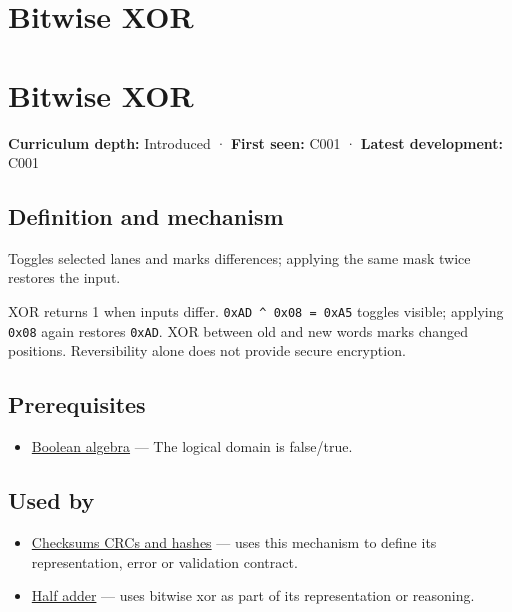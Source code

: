 \hypertarget{appendix-d49161831368}{}
\section*{Bitwise XOR}
\section{Bitwise XOR}\label{appendix-d49161831368-bitwise-xor}

\textbf{Curriculum depth:} Introduced · \textbf{First seen:} C001 · \textbf{Latest development:} C001

\subsection{Definition and mechanism}\label{appendix-d49161831368-definition-and-mechanism}

Toggles selected lanes and marks differences; applying the same mask twice restores the input.

XOR returns 1 when inputs differ. \texttt{0xAD\ \^{}\ 0x08\ =\ 0xA5} toggles visible; applying \texttt{0x08} again restores \texttt{0xAD}. XOR between old and new words marks changed positions. Reversibility alone does not provide secure encryption.

\subsection{Prerequisites}\label{appendix-d49161831368-prerequisites}

\begin{itemize}
\tightlist
\item
  \hyperref[appendix-24475e1596a8]{Boolean algebra} --- The logical domain is false/true.
\end{itemize}

\subsection{Used by}\label{appendix-d49161831368-used-by}

\begin{itemize}
\item
  \hyperref[appendix-ed338677de0a]{Checksums CRCs and hashes} --- uses this mechanism to define its representation, error or validation contract.
\item
  \hyperref[appendix-1652d27a8e90]{Half adder} --- uses bitwise xor as part of its representation or reasoning.
\end{itemize}

